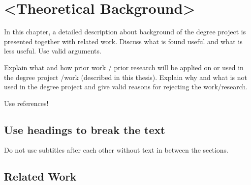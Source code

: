 \chapter{<Theoretical Background>}
In this chapter, a detailed description about background of the degree project is presented together with related work. Discuss what is found useful and what is less useful. Use valid arguments.

Explain what and how prior work / prior research will be applied on or used in the degree project /work (described in this thesis). Explain why and what is not used in the degree project and give valid reasons for rejecting the work/research.

Use references!

\section{Use headings to break the text}
Do not use subtitles after each other without text in between the sections.

\section{Related Work}

